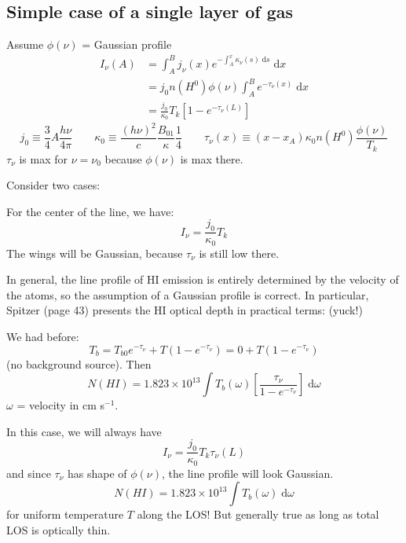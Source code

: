 \documentclass[11pt]{article}
\newcommand{\mar}[1]{\hspace{0pt}\marginpar{-\textcolor{black}{#1}-}}
\begin{document}
\subsection{Simple case of a single layer of gas}
Assume $\phi(\nu)$ = Gaussian profile
\begin{align*}
    I_{\nu} (A)
    &= \int_{A}^{B}{
        j_{\nu} (x) e^{-\int_{A}^{x} \kappa_{\nu} (s) \;\mathrm{d}s}\;\mathrm{d}x}
    \\ &= j_{0} n(H^{0}) \phi(\nu) \int_{A}^{B}{
        e^{-\tau_{\nu}(x)}\;\mathrm{d}x}
    \\ &= \frac{j_{0}}{\kappa_{0}} T_{k} \left[ 1 - e^{-\tau_{\nu}(L)} \right]
\end{align*}
\[
    j_{0} \equiv \frac{3}{4} A \frac{h\nu}{4\pi}
    \qquad
    \kappa_{0} \equiv \frac{(h\nu)^{2}}{c} \frac{B_{01}}{\kappa} \frac{1}{4}
    \qquad
    \tau_{\nu}(x) \equiv (x - x_{A}) \kappa_{0} n(H^{0}) \frac{\phi(\nu)}{T_{k}}
    \]
\[
    \]
$\tau_{\nu}$ is max for $\nu = \nu_{0}$ because $\phi(\nu)$ is max there.

\mar{39}Consider two cases:
\begin{description}[itemsep=1ex, style=nextline] %
    \item [(i) Optically thick: $\tau_{\nu_{o}}(L) \gg 1$]
        For the center of the line, we have:
        \[
            I_{\nu} = \frac{j_{0}}{\kappa_{0}} T_{k}
            \]
        The wings will be Gaussian, because $\tau_{\nu}$ is still low there.

        In general, the line profile of HI emission is entirely determined by the
        velocity of the atoms, so the assumption of a Gaussian profile is correct.
        In particular, Spitzer (page 43) presents the HI optical depth in practical
        terms: (yuck!)

        \mar{40}We had before:
        \[
            T_{b} = T_{b0} e^{-\tau_{\nu}} + T (1 - e^{-\tau_{\nu}} )
            = 0 + T (1 - e^{-\tau_{\nu}} )
            \]
        (no background source). Then
        \[
            N(HI) = 1.823 \times 10^{13} \int{ T_{b} (\omega) \left[
                \frac{\tau_{\nu}}{1 - e^{-\tau_{\nu}}} \right]
            \;\mathrm{d}\omega}
            \]
        $\omega$ = velocity in cm s$^{-1}$.
    \item [(ii) Optically thin: $\tau_{\nu_{o}}(L) \ll 1$]
        In this case, we will always have
        \[
            I_{\nu} = \frac{j_{0}}{\kappa_{0}} T_{k} \tau_{\nu}(L)
            \]
        and since $\tau_{\nu}$ has shape of $\phi(\nu)$, the line profile will
        look Gaussian.
        \[
            N(HI) = 1.823 \times 10^{13} \int{ T_{b} (\omega)
            \;\mathrm{d}\omega}
            \]
        for uniform temperature $T$ along the LOS! But generally true
        as long as total LOS is optically thin.
\end{description}
\end{document}
